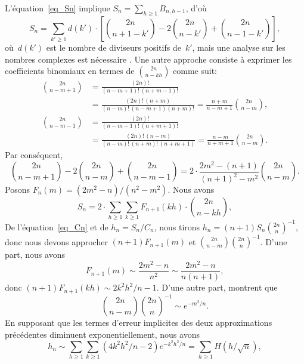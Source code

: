 L'équation~\eqref{eq_Sn} implique \(S_{n} = \sum_{h \geqslant 1}
B_{n,h-1}\), d'où
\begin{equation*}
S_{n} = \sum_{k' \geqslant 1}d(k') \cdot
         \left[\binom{2n}{n+1-k'} - 2\binom{2n}{n-k'}
         + \binom{2n}{n-1-k'}\right],
\end{equation*}
où~\(d(k')\) est le nombre de diviseurs positifs de~\(k'\), mais une
analyse sur les nombres complexes est nécessaire
\citep{KnuthdeBruijnRice_1972,FlajoletGourdonDumas_1995}. Une autre
approche consiste à exprimer les coefficients binomiaux en termes de
\(\binom{2n}{n-kh}\) comme suit:
\begin{align*}
\binom{2n}{n-m+1} &= \frac{(2n)!}{(n-m+1)!\,(n+m-1)!}\\
                  &= \frac{(2n)!\,(n+m)}{(n-m)!\,(n-m+1)(n+m)!}
                   = \frac{n+m}{n-m+1}\binom{2n}{n-m},\\
\binom{2n}{n-m-1} &= \frac{(2n)!}{(n-m-1)!\,(n+m+1)!}\\
                  &= \frac{(2n)!\,(n-m)}{(n-m)!\,(n+m)!\,(n+m+1)}
                   = \frac{n-m}{n+m+1}\binom{2n}{n-m}.
\end{align*}
Par conséquent,
\begin{equation*}
\binom{2n}{n-m+1} - 2\binom{2n}{n-m} + \binom{2n}{n-m-1}
= 2 \cdot \frac{2m^2-(n+1)}{(n+1)^2-m^2}\binom{2n}{n-m}.
\end{equation*}
Posons \(F_n(m) = (2m^2-n)/(n^2-m^2)\). Nous avons
\begin{equation*}
S_{n} = 2 \cdot \sum_{h \geqslant 1}\sum_{k \geqslant 1} F_{n+1}(kh)
\cdot \binom{2n}{n-kh},
\end{equation*}
De l'équation~\eqref{eq_Cn} et de \(h_n = S_n/C_n\), nous tirons
\(h_{n} = (n+1)S_{n}{\binom{2n}{n}}^{-1}\), donc nous devons approcher
\((n+1)F_{n+1}(m)\) et \(\binom{2n}{n-m}\binom{2n}{n}^{-1}\). D'une
part, nous avons
\begin{equation*}
F_{n+1}(m) \sim \frac{2m^2-n}{n^2} \sim \frac{2m^2-n}{n(n+1)},
\end{equation*}
donc \((n+1)F_{n+1}(kh) \sim 2k^2h^2\!/n-1\). D'une autre part,
\citet*[4.6, 4.8]{SedgewickFlajolet_1996} montrent que
\begin{equation*}
\binom{2n}{n-m}{\binom{2n}{n}}^{-1} \sim e^{-m^2\!/n}.
\end{equation*}
En supposant que les termes d'erreur implicites des deux
approximations précédentes diminuent exponentiellement, nous avons
\begin{equation*}
h_{n} \sim \sum_{h \geqslant 1}\sum_{k \geqslant 1}
(4k^2h^2\!/n - 2)e^{-k^2h^2\!/n}
= \sum_{h \geqslant 1}H(h/\!\sqrt{n}),
\end{equation*}
